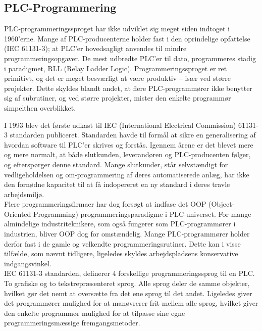 \subsection{PLC-Programmering}
PLC-programmeringssproget har ikke udviklet sig meget siden indtoget i 1960’erne. Mange af PLC-producenterne holder fast i den oprindelige opfattelse (IEC 61131-3); at PLC’er hovedsagligt anvendes til mindre programmeringsopgaver. De mest udbredte PLC’er til dato, programmeres stadig i paradigmet, RLL (Relay Ladder Logic). Programmeringssproget er ret primitivt, og det er meget besværligt at være produktiv – især ved større projekter. Dette skyldes blandt andet, at flere PLC-programmører ikke benytter sig af subrutiner, og ved større projekter, mister den enkelte programmør simpelthen overblikket. 

I 1993 blev det første udkast til IEC (International Electrical Commission) 61131-3 standarden publiceret\cite{iecStandard}. Standarden havde til formål at sikre en generalisering af hvordan software til PLC'er skrives og forstås. Igennem årene er det blevet mere og mere normalt, at både slutkunden, leverandøren og PLC-producenten følger, og efterspørger denne standard. Mange slutkunder, står selvstændigt for vedligeholdelsen og om-programmering af deres automatiserede anlæg, har ikke den fornødne kapacitet til at få indopereret en ny standard i deres travle arbejdsmiljø. \\

\noindent Flere programmeringsfirmaer har dog forsøgt at indfase det OOP (Object-Oriented Programming) programmeringsparadigme i PLC-universet. For mange almindelige industriteknikere, som også fungerer som PLC-programmører i industrien, bliver OOP dog for omstændelig. Mange PLC-programmører holder derfor fast i de gamle og velkendte programmeringsrutiner. Dette kan i visse tilfælde, som nævnt tidligere, ligeledes skyldes arbejdspladsens konservative indgangsvinkel. \cite{PLC_Siemens_OOP} \\

\noindent IEC 61131-3 standarden, definerer 4 forskellige programmeringssprog til en PLC. To grafiske og to tekstrepræsenteret sprog. Alle sprog deler de samme objekter, hvilket gør det nemt at oversætte fra det ene sprog til det andet. Ligeledes giver det programmører mulighed for at manøvrerer frit mellem alle sprog, hvilket giver den enkelte programmør mulighed for at tilpasse sine egne programmeringsmæssige fremgangsmetoder. 

